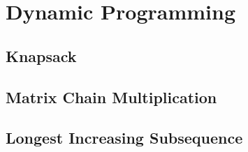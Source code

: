 \documentclass[../Notes/main.tex]{subfiles}
\begin{document}
\section{Dynamic Programming}

\subsection{Knapsack}


\subsection{Matrix Chain Multiplication}


\subsection{Longest Increasing Subsequence}

\end{document}
